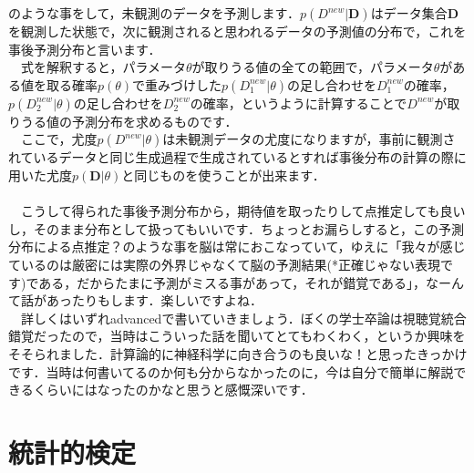 \documentclass[11pt,a4paper]{jsarticle}                    %
\begin{document}
のような事をして，未観測のデータを予測します．$p(D^{new}|\mathbf{D})$はデータ集合$\mathbf{D}$を観測した状態で，次に観測されると思われるデータの予測値の分布で，これを事後予測分布と言います．\\
　式を解釈すると，パラメータ$\theta$が取りうる値の全ての範囲で，パラメータ$\theta$がある値を取る確率$p(\theta)$で重みづけした$p(D^{new}_1|\theta)$の足し合わせを$D^{new}_1$の確率，$p(D^{new}_2|\theta)$の足し合わせを$D^{new}_2$の確率，というように計算することで$D^{new}$が取りうる値の予測分布を求めるものです．\\
　ここで，尤度$p(D^{new}|\theta)$は未観測データの尤度になりますが，事前に観測されているデータと同じ生成過程で生成されているとすれば事後分布の計算の際に用いた尤度$p(\mathbf{D}|\theta)$と同じものを使うことが出来ます．\\
\\
　こうして得られた事後予測分布から，期待値を取ったりして点推定しても良いし，そのまま分布として扱ってもいいです．ちょっとお漏らしすると，この予測分布による点推定？のような事を脳は常におこなっていて，ゆえに「我々が感じているのは厳密には実際の外界じゃなくて脳の予測結果(*正確じゃない表現です)である，だからたまに予測がミスる事があって，それが錯覚である」，なーんて話があったりもします．楽しいですよね．\\
　詳しくはいずれadvancedで書いていきましょう．ぼくの学士卒論は視聴覚統合錯覚だったので，当時はこういった話を聞いてとてもわくわく，というか興味をそそられました．計算論的に神経科学に向き合うのも良いな！と思ったきっかけです．当時は何書いてるのか何も分からなかったのに，今は自分で簡単に解説できるくらいにはなったのかなと思うと感慨深いです．\\




\section{統計的検定}
\end{document}
